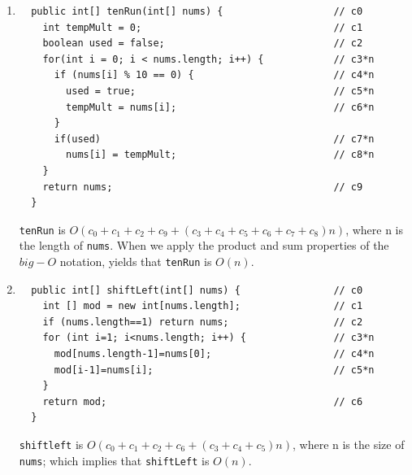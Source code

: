 \documentclass[a4paper,12pt]{article}
\begin{document}
\begin{enumerate}
  \item \begin{Verbatim}
  public int[] tenRun(int[] nums) {                   // c0
    int tempMult = 0;                                 // c1
    boolean used = false;                             // c2
    for(int i = 0; i < nums.length; i++) {            // c3*n
      if (nums[i] % 10 == 0) {                        // c4*n
        used = true;                                  // c5*n
        tempMult = nums[i];                           // c6*n
      }
      if(used)                                        // c7*n
        nums[i] = tempMult;                           // c8*n
    }
    return nums;                                      // c9
  }
  \end{Verbatim}
  \texttt{tenRun} is $O(c_0+c_1+c_2+c_9+(c_3+c_4+c_5+c_6+c_7+c_8)n)$, where n is the length of \texttt{nums}. When we apply
  the product and sum properties of the $big-O$ notation, yields that
  \texttt{tenRun} is $O(n)$.

  \item \begin{Verbatim}
  public int[] shiftLeft(int[] nums) {                // c0
    int [] mod = new int[nums.length];                // c1
    if (nums.length==1) return nums;                  // c2
    for (int i=1; i<nums.length; i++) {               // c3*n
      mod[nums.length-1]=nums[0];                     // c4*n
      mod[i-1]=nums[i];                               // c5*n
    }
    return mod;                                       // c6
  }
  \end{Verbatim}
  \texttt{shiftleft} is $O(c_0+c_1+c_2+c_6+(c_3+c_4+c_5)n)$, where n is the size of \texttt{nums}; which implies
  that \texttt{shiftLeft} is $O(n)$.
  \end{enumerate}
\end{document}
